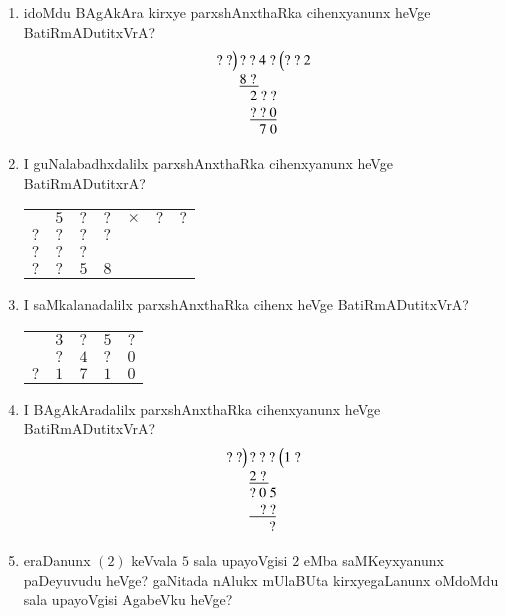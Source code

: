 \begin{enumerate}
\item idoMdu BAgAkAra kirxye parxshAnxthaRka cihenxyanunx heVge BatiRmADutitxVrA?
$$
\begin{array}{r@{\,}l@{\,}l}
?~?\Big) &?~?~4~? & \Big(?~?~2\\
         & \underline{8~?\,} & \\
         & ~~~2~?~?\\
         & ~~~\underline{?~?~0}\\
         & ~\,~~~~7~0
\end{array}
$$

\item I guNalabadhxdalilx parxshAnxthaRka cihenxyanunx heVge BatiRmADutitxrA?
\begin{center}
\begin{tabular}{ccccccc}
 & $5$ & $?$ & $?$ & $\times$ & $?$ & $?$\\
\cline{2-7}
$?$ & $?$ & $?$ & $?$ & & &\\
$?$ & $?$ & $?$ &  & & &\\
\cline{1-5}
$?$ & $?$ & $5$ & $8$ & & &
\end{tabular}
\end{center}

\item I saMkalanadalilx parxshAnxthaRka cihenx heVge BatiRmADutitxVrA?
\begin{center}
\begin{tabular}{ccccc}
 & $3$ & $?$ & $5$ & $?$\\
 & $?$ & $4$ & $?$ & $0$\\
\cline{2-5}
$?$ & $1$ & $7$ & $1$ & $0$
\end{tabular}
\end{center}

\item I BAgAkAradalilx parxshAnxthaRka cihenxyanunx heVge BatiRmADutitxVrA?
$$
\begin{array}{r@{\,}l@{\,}l}
?~?\Big) &?~?~? & \Big(1~?\\
         & \underline{2~?\,} & \\
         &?~0~5\\
         & \underline{~~~?~?}\\
         & ~\,~~~~?
\end{array}
$$

\item eraDanunx $(2)$ keVvala $5$ sala upayoVgisi $2$ eMba saMKeyxyanunx paDeyuvudu heVge? gaNitada nAlukx mUlaBUta kirxyegaLanunx oMdoMdu sala upayoVgisi AgabeVku heVge?


\end{enumerate}
